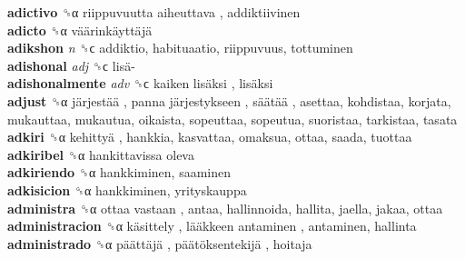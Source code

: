 \textbf{adictivo} ␝α   riippuvuutta aiheuttava , addiktiivinen  \\
\textbf{adicto} ␝α   väärinkäyttäjä   \\
\textbf{adikshon} \emph{n}  ␝ϲ  addiktio, habituaatio, riippuvuus, tottuminen  \\
\textbf{adishonal} \emph{adj}  ␝ϲ   lisä-   \\
\textbf{adishonalmente} \emph{adv}  ␝ϲ   kaiken lisäksi ,  lisäksi   \\
\textbf{adjust} ␝α   järjestää ,  panna järjestykseen ,  säätää , asettaa, kohdistaa, korjata, mukauttaa, mukautua, oikaista, sopeuttaa, sopeutua, suoristaa, tarkistaa, tasata  \\
\textbf{adkiri} ␝α   kehittyä , hankkia, kasvattaa, omaksua, ottaa, saada, tuottaa  \\
\textbf{adkiribel} ␝α   hankittavissa oleva   \\
\textbf{adkiriendo} ␝α  hankkiminen, saaminen  \\
\textbf{adkisicion} ␝α  hankkiminen, yrityskauppa  \\
\textbf{administra} ␝α   ottaa vastaan , antaa, hallinnoida, hallita, jaella, jakaa, ottaa  \\
\textbf{administracion} ␝α   käsittely ,  lääkkeen antaminen , antaminen, hallinta  \\
\textbf{administrado} ␝α   päättäjä ,  päätöksentekijä , hoitaja  \\
